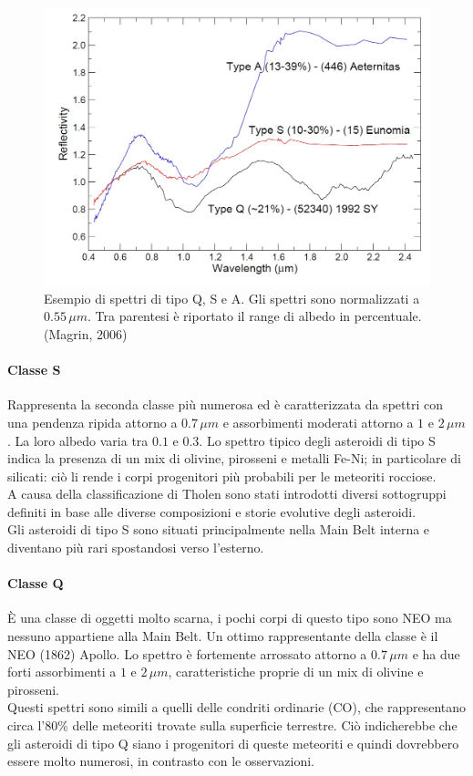 \documentclass[a4paper,11pt,openright]{book}
\begin{document}
\begin{figure}
\centering
\includegraphics[scale=0.3]{figure/spettro_qsa.jpg}
\caption[Esempio di spettri di tipo Q, S e A.]{Esempio di spettri di tipo Q, S e A. Gli spettri sono normalizzati a $0.55\,\mu m$. Tra parentesi è riportato il range di albedo in percentuale. (Magrin, 2006)}
\label{spettro_qsa}
\end{figure}

\paragraph*{Classe S}
Rappresenta la seconda classe più numerosa ed è caratterizzata da spettri con una pendenza ripida attorno a $0.7\,\mu m$ e assorbimenti moderati attorno a $1$ e $2\,\mu m$. La loro albedo varia tra $0.1$ e $0.3$. Lo spettro tipico degli asteroidi di tipo S indica la presenza di un mix di olivine, pirosseni e metalli Fe-Ni; in particolare di silicati: ciò li rende i corpi progenitori più probabili per le meteoriti rocciose.\\
A causa della classificazione di Tholen sono stati introdotti diversi sottogruppi definiti in base alle diverse composizioni e storie evolutive degli asteroidi.\\
Gli asteroidi di tipo S sono situati principalmente nella Main Belt interna e diventano più rari spostandosi verso l'esterno.

\paragraph*{Classe Q}
È una classe di oggetti molto scarna, i pochi corpi di questo tipo sono NEO ma nessuno appartiene alla Main Belt. Un ottimo rappresentante della classe è il NEO (1862) Apollo. Lo spettro è fortemente arrossato attorno a $0.7\,\mu m$ e ha due forti assorbimenti a $1$ e $2\,\mu m$, caratteristiche proprie di un mix di olivine e pirosseni.\\
Questi spettri sono simili a quelli delle condriti ordinarie (CO), che rappresentano circa l'80\% delle meteoriti trovate sulla superficie terrestre. Ciò indicherebbe che gli asteroidi di tipo Q siano i progenitori di queste meteoriti e quindi dovrebbero essere molto numerosi, in contrasto con le osservazioni.
\end{document}
